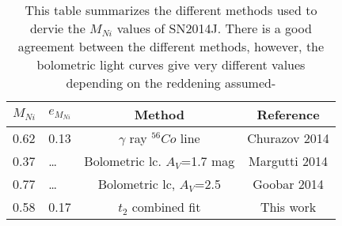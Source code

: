 \begin{table}
\caption{This table summarizes the different methods used to dervie the $M_{Ni}$ values of SN2014J. There is a good agreement between the different methods, however, the bolometric light curves give very different values depending on the reddening assumed-}

\begin{center}
\begin{tabular}{llcc}
\hline
$M_{Ni}$ & $e_{M_{Ni}}$  & Method & Reference\\
\hline
0.62 & 0.13 & $\gamma$ ray ${^56}Co$ line		 & Churazov 2014\\
0.37 & 	 \ldots	& Bolometric lc. $A_V$=1.7 mag & Margutti 2014		\\
0.77 &	 \ldots & Bolometric lc, $A_V$=2.5	& Goobar 2014 \\
0.58 & 0.17 & $t_2$ combined fit	& This work \\
\hline
\end{tabular}
\label{tab:14j}
\end{center}
\end{table}
